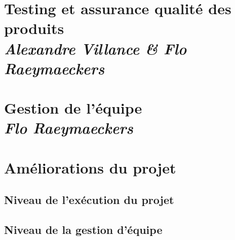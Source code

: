 \documentclass[11pt]{report}
\newcommand\Chapter[2]{\chapter
  [#1\hfil\hbox{}\protect\linebreak{\itshape#2}]%
  {#1\\[2ex]\large\itshape#2}%
}
\begin{document}
\Chapter{Testing et assurance qualité des produits}{Alexandre Villance \& Flo Raeymaeckers}



\Chapter{Gestion de l'équipe}{Flo Raeymaeckers}



\chapter{Améliorations du projet}



\section{Niveau de l'exécution du projet}

\section{Niveau de la gestion d'équipe}



\end{document}
